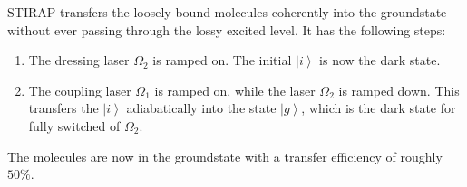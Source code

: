 \documentclass[10pt]{article}
\newcommand{\ket}[1]{\ensuremath{\left|#1\right\rangle}}
\begin{document}
STIRAP transfers the loosely bound molecules coherently into the groundstate without ever passing through the lossy excited level. It has the following steps:
\begin{enumerate}
\item The dressing laser $\Omega_2$ is ramped on. The initial $\ket{i}$ is now the dark state.
\item The coupling laser $\Omega_1$ is ramped on, while the laser $\Omega_2$ is ramped down. This transfers the $\ket{i}$ adiabatically into the state $\ket{g}$, which is the dark state for fully switched of $\Omega_2$. 
\end{enumerate}
The molecules are now in the groundstate with a transfer efficiency of roughly $50\%$.

\FloatBarrier


\end{document}
